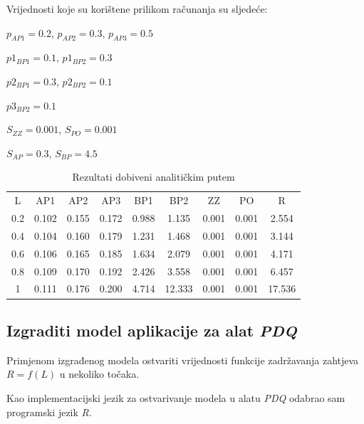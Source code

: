 \documentclass[11pt]{article}
\begin{document}
\vspace{10px}

Vrijednosti koje su korištene prilikom računanja su sljedeće:

$ p_{AP1} = 0.2 $, $ p_{AP2} = 0.3 $, $ p_{AP3} = 0.5 $

$ p1_{BP1} = 0.1 $, $ p1_{BP2} = 0.3 $

$ p2_{BP1} = 0.3 $, $ p2_{BP2} = 0.1 $

$ p3_{BP2} = 0.1 $

$ S_{ZZ} = 0.001 $, $ S_{PO} = 0.001 $

$ S_{AP} = 0.3 $, $ S_{BP} = 4.5 $

\begin{table}[h!]
  \begin{center}
    \begin{tabular}{| c c c c c c c c c |}
    \hline
L    & AP1 & AP2 & AP3 & BP1 & BP2 & ZZ & PO & R \\
0.2 & 0.102 & 0.155 & 0.172 & 0.988 & 1.135 & 0.001 & 0.001 & 2.554\\
0.4 & 0.104 & 0.160 & 0.179 & 1.231 & 1.468 & 0.001 & 0.001 & 3.144\\
0.6 & 0.106 & 0.165 & 0.185 & 1.634 & 2.079 & 0.001 & 0.001 & 4.171\\
0.8 & 0.109 & 0.170 & 0.192 & 2.426 & 3.558 & 0.001 & 0.001 & 6.457\\
1 & 0.111 & 0.176 & 0.200 & 4.714 & 12.333 & 0.001 & 0.001 & 17.536\\

    \hline
    \end{tabular}
  \end{center}
  \caption{Rezultati dobiveni analitičkim putem}
\end{table}

\subsection{Izgraditi model aplikacije za alat \emph{PDQ}}
Primjenom izgrađenog modela ostvariti vrijednosti funkcije zadržavanja zahtjeva $R = f(L)$ u nekoliko točaka.

Kao implementacijski jezik za ostvarivanje modela u alatu \emph{PDQ} odabrao sam programski jezik \emph{R}.  
\end{document}
